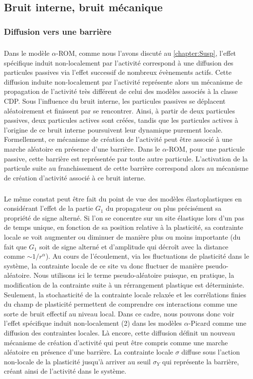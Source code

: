 \endgroup

\subsection{Bruit interne, bruit mécanique}

\subsubsection{Diffusion vers une barrière}

\subparagraph{}Dans le modèle $\alpha$-ROM, comme nous l'avons discuté au \autoref{chapter:Susp}, l'effet spécifique induit non-localement par l'activité correspond à une diffusion des particules passives via l'effet successif de nombreux évènements actifs. Cette diffusion induite non-localement par l'activité représente alors un mécanisme de propagation de l'activité très différent de celui des modèles associés à la classe CDP. Sous l’influence du bruit interne, les particules passives se déplacent aléatoirement et finissent par se rencontrer. Ainsi, à partir de deux particules passives, deux particules actives sont créées, tandis que les particules actives à l'origine de ce bruit interne poursuivent leur dynamique purement locale. Formellement, ce mécanisme de création de l'activité peut être associé à une marche aléatoire en présence d'une barrière. Dans le $\alpha$-ROM, pour une particule passive, cette barrière est représentée par toute autre particule. L'activation de la particule suite au franchissement de cette barrière correspond alors au mécanisme de création d'activité associé à ce bruit interne.

\subparagraph{}Le même constat peut être fait du point de vue des modèles élastoplastiques en considérant l'effet de la partie $G_1$ du propagateur ou plus précisément sa propriété de signe alterné. Si l'on se concentre sur un site élastique lors d'un pas de temps unique, en fonction de sa position relative à la plasticité, sa contrainte locale se voit augmenter ou diminuer de manière plus ou moins importante (du fait que $G_1$ soit de signe alterné et d'amplitude qui décroît avec la distance comme $\sim 1/r^\alpha$). Au cours de l'écoulement, via les fluctuations de plasticité dans le système, la contrainte locale de ce site va donc fluctuer de manière pseudo-aléatoire. Nous utilisons ici le terme pseudo-aléatoire puisque, en pratique, la modification de la contrainte suite à un rérrangement plastique est déterministe. Seulement, la stochasticité de la contrainte locale relaxée et les corrélations finies du champ de plasticité permettent de comprendre ces interactions comme une sorte de bruit effectif au niveau local. Dans ce cadre, nous pouvons donc voir l'effet spécifique induit non-localement (2) dans les modèles $\alpha$-Picard comme une diffusion des contraintes locales. Là encore, cette diffusion définit un nouveau mécanisme de création d'activité qui peut être compris comme une marche aléatoire en présence d'une barrière. La contrainte locale $\sigma$ diffuse sous l'action non-locale de la plasticité jusqu'à arriver au seuil $\sigma_Y$ qui représente la barrière, créant ainsi de l'activité dans le système. 

